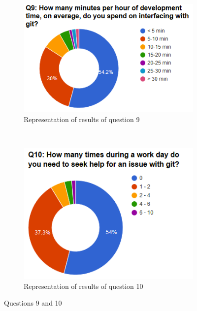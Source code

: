 \documentclass[a4paper,oneside]{bth} %
\begin{document}
			\begin{figure}[H]
				\centering
				\begin{subfigure}[b]{0.45\textwidth}
					\includegraphics[width=\textwidth]{graphs/q9.png}
					\caption{Representation of results of question 9}
					\label{fig:q9}
				\end{subfigure}
				~
				\begin{subfigure}[b]{0.45\textwidth}
					\includegraphics[width=\textwidth]{graphs/q10.png}
					\caption{Representation of results of question 10}
					\label{fig:q10}
				\end{subfigure}
				\caption{Questions 9 and 10}\label{fig:q9-q10}
			\end{figure}
\end{document}

